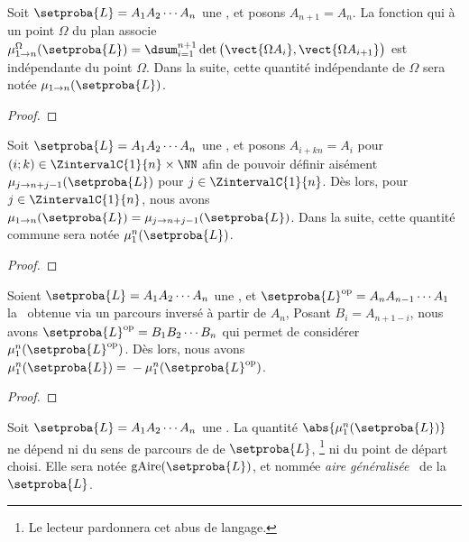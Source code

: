 	


\begin{fact}
	Soit $\setproba{L} = A_1 A_2 \cdots A_n$ une \nline, et posons $A_{n+1} = A_n$.
	La fonction qui à un point $\Omega$ du plan associe 
	$\mu_{1 \to n}^\Omega (\setproba{L}) = \dsum_{i=1}^{n+1} \det \big( \vect{\Omega A_i} , \vect{\Omega A_{i+1}} \big)$ est indépendante du point $\Omega$.
	Dans la suite, cette quantité indépendante de $\Omega$ sera notée $\mu_{1 \to n} (\setproba{L})$.
\end{fact}


\begin{proof}
\end{proof}
	
	


\begin{fact} \label{nline-shift-inva}
	Soit $\setproba{L} = A_1 A_2 \cdots A_n$ une \nline, et posons $A_{i + kn} = A_i$ pour $(i;k) \in \ZintervalC{1}{n} \times \NN$ afin de pouvoir définir aisément $\mu_{j \to n+j-1} (\setproba{L})$ pour $j \in \ZintervalC{1}{n}$.
	Dès lors, pour $j \in \ZintervalC{1}{n}$, nous avons
	$\mu_{1 \to n} (\setproba{L}) = \mu_{j \to n+j-1} (\setproba{L})$.
	Dans la suite, cette quantité commune sera notée $\mu_1^n (\setproba{L})$.
\end{fact}


\begin{proof}
\end{proof}
	
	


\begin{fact} \label{nline-rota-inva}
	Soient 
	$\setproba{L} = A_1 A_2 \cdots A_n$ une \nline, et 
	$\setproba{L}^{\mathrm{op}} = A_n A_{n-1} \cdots A_1$ la \nline\ obtenue via un parcours inversé à partir de $A_n$, 
	Posant $B_i = A_{n + 1 - i}$, nous avons $\setproba{L}^{\mathrm{op}} = B_1 B_2 \cdots B_n$ qui permet de considérer $\mu_1^n (\setproba{L}^{\mathrm{op}})$.
	Dès lors, nous avons
	$\mu_1^n (\setproba{L}) = {} - \mu_1^n (\setproba{L}^{\mathrm{op}})$.
\end{fact}


\begin{proof}
\end{proof}
	
	


\begin{fact}
	Soit 
	$\setproba{L} = A_1 A_2 \cdots A_n$ une \nline.
	La quantité $\abs{\mu_1^n (\setproba{L})}$ ne dépend ni du sens de parcours de de $\setproba{L}$,%
	\footnote{
		Le lecteur pardonnera cet abus de langage.
	}
	ni du point de départ choisi.
	Elle sera notée $\garea{\setproba{L}}$, et nommée \og \emph{aire généralisée} \fg\ de la \nline\ $\setproba{L}$.
\end{fact}


